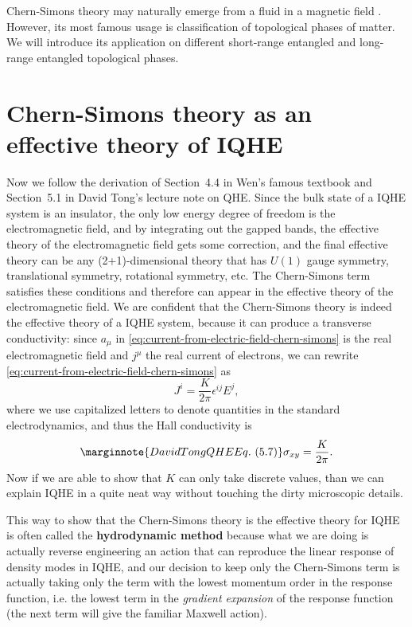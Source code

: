 \documentclass[hyperref, a4paper]{article}
\newcommand*{\concept}[1]{{\textbf{#1}}}
\begin{document}
Chern-Simons theory may naturally emerge from a fluid in a magnetic field \cite{Bahcall}.
However, its most famous usage is classification of topological phases of matter. We will introduce 
its application on different short-range entangled and long-range entangled topological phases.

\section{Chern-Simons theory as an effective theory of IQHE}

Now we follow the derivation of Section~4.4 in Wen's famous textbook and Section~5.1 in David Tong's lecture 
note on QHE. 
Since the bulk state of a IQHE system is an insulator, the only low energy degree of freedom is the electromagnetic 
field, and by integrating out the gapped bands, the effective theory of the electromagnetic field gets some 
correction, and the final effective theory can be any (2+1)-dimensional theory that has $U(1)$ gauge 
symmetry, translational symmetry, rotational symmetry, etc. The Chern-Simons term satisfies these 
conditions and therefore can appear in the effective theory of the electromagnetic field. We are 
confident that the Chern-Simons theory is indeed the effective theory of a IQHE system, because it 
can produce a transverse conductivity: since $a_\mu$ in \eqref{eq:current-from-electric-field-chern-simons} is 
the real electromagnetic field and $j^\mu$ the real current of electrons, we can rewrite 
\eqref{eq:current-from-electric-field-chern-simons} 
as 
\begin{equation}
    J^i = \frac{K}{2\pi} \epsilon^{ij} E^j,
    \label{eq:iqhe-eom}
\end{equation}
where we use capitalized letters to denote quantities in the standard electrodynamics,
and thus the Hall conductivity is 
\begin{equation} \marginnote{David Tong QHE Eq.~(5.7)}
    \sigma_{xy} = \frac{K}{2\pi}. 
\end{equation}
Now if we are able to show that $K$ can only take discrete values, than we can explain IQHE in a quite 
neat way without touching the dirty microscopic details.

This way to show that the Chern-Simons theory is the effective theory for IQHE is often called the 
\concept{hydrodynamic method} because what we are doing is actually reverse engineering an action that 
can reproduce the linear response of density modes in IQHE, and our decision to keep only the Chern-Simons term 
is actually taking only the term with the lowest momentum order in the response function, i.e. the lowest 
term in the \emph{gradient expansion} of the response function (the next term will give the familiar Maxwell 
action). 
\end{document}
